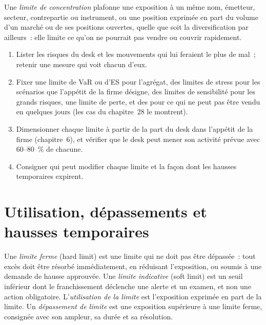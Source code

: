 \begin{definition}\label{def:fm:limits-and-capital-allocation:conc}
Une \emph{limite de concentration} plafonne une exposition à un même nom, émetteur, secteur, contrepartie ou instrument, ou une position
exprimée en part du volume d'un marché ou de ses positions ouvertes, quelle que soit la diversification par ailleurs~: elle limite ce qu'on ne pourrait pas vendre ou couvrir rapidement.
\end{definition}

\begin{method}\label{met:fm:limits-and-capital-allocation:choose}
\begin{enumerate}
\item Lister les risques du desk et les mouvements qui lui feraient le plus de mal~; retenir une mesure qui voit chacun d'eux.
\item Fixer une limite de VaR ou d'ES pour l'agrégat, des limites de stress pour les scénarios que l'appétit de la firme désigne, des limites de sensibilité pour les grands
risques, une limite de perte, et des  pour ce qui ne peut pas être vendu en quelques jours (les cas du chapitre~28 le montrent).
\item Dimensionner chaque limite à partir de la part du desk dans l'appétit de la firme (chapitre~6), et vérifier que le desk peut mener son activité prévue avec 60--80~\%
de chacune.
\item Consigner qui peut modifier chaque limite et la façon dont les hausses temporaires expirent.
\end{enumerate}
\end{method}

\section{Utilisation, dépassements et hausses temporaires}

\begin{definition}\label{def:fm:limits-and-capital-allocation:breach}
Une \emph{limite ferme} (hard limit) est une limite qui ne doit pas être dépassée~: tout excès doit être résorbé immédiatement, en réduisant l'exposition, ou
soumis à une demande de hausse approuvée. Une \emph{limite indicative} (soft limit) est un seuil inférieur dont le franchissement déclenche une alerte et un examen, et non une
action obligatoire. L'\emph{utilisation de la limite} est l'exposition exprimée en part de la limite. Un
\emph{dépassement de limite} est une exposition supérieure à une limite ferme, consignée avec son ampleur, sa durée et sa résolution.
\end{definition}

